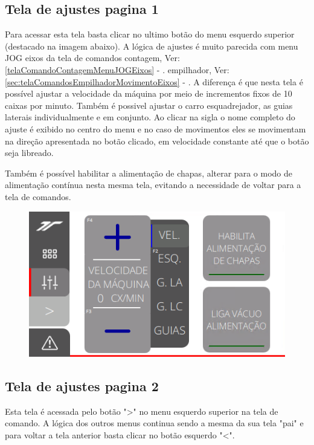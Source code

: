 \newpage
\thispagestyle{fancy}
\vspace*{40 pt}
\subsection{Tela de ajustes pagina 1}\label{ihmAlimentacaoTelaAjustesPagina1}

Para acessar esta tela basta clicar no ultimo botão do menu esquerdo superior (destacado na imagem abaixo). 
A lógica de ajustes é muito parecida com menu JOG eixos da tela de comandos 
\ifmachineType
contagem, Ver: \ref{telaComandoContagemMenuJOGEixos} - .
\else
empilhador, Ver: \ref{sec:telaComandosEmpilhadorMovimentoEixos} - .
A diferença é que nesta tela é possível ajustar a velocidade da máquina por meio
de incrementos fixos de 10 caixas por minuto. Também é possivel ajustar o carro esquadrejador, as guias laterais individualmente e em conjunto.
Ao clicar na sigla o nome completo do ajuste é exibido no centro do menu e no caso de movimentos eles se movimentam na direção apresentada no botão clicado,
em velocidade constante até que o botão seja libreado.

Também é possível habilitar a alimentação de chapas, alterar para o modo de alimentação contínua nesta mesma tela, evitando a necessidade de voltar para a tela de comandos.

\vspace*{\fill}
\begin{figure}[h]
  \centering
  \includegraphics{src/imagesFlexo/11-IHMALM/e-4.png}
\end{figure}
\vspace*{\fill}

\newpage
\thispagestyle{fancy}
\vspace*{40 pt}
\subsection{Tela de ajustes pagina 2}\label{telaAjustes2}
Esta tela é acessada pelo botão "\textgreater" no menu esquerdo superior na tela de comando. A lógica dos outros menus continua sendo a mesma da sua tela "pai" e para voltar a tela anterior basta clicar no botão esquerdo "\textless{}".

